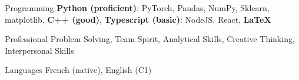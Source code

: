 

\begin{cvskills}

  \cvskill
    {Programming} %
    {\textbf{Python (proficient)}: PyTorch, Pandas, NumPy, Sklearn, matplotlib, \textbf{C++ (good)}, \textbf{Typescript (basic)}: NodeJS, React,  \textbf{LaTeX}} %

  \cvskill
    {Professional} %
    {Problem Solving, Team Spirit, Analytical Skills, Creative Thinking, Interpersonal Skills} %

  \cvskill
    {Languages} %
    {French (native), English (C1)} %

\end{cvskills}
